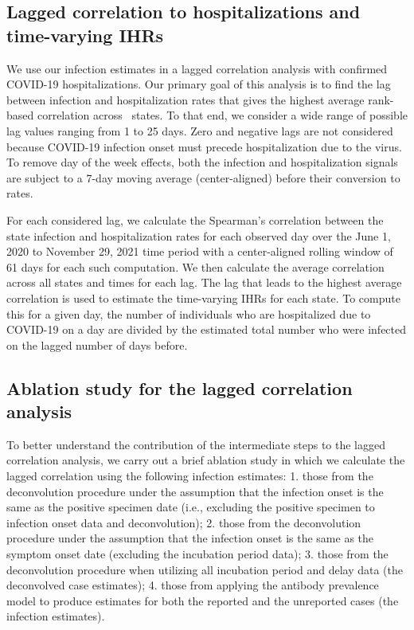 \documentclass{article}
\begin{document}
\subsection{Lagged correlation to hospitalizations and time-varying IHRs} 

We use our infection estimates in a lagged correlation analysis with
confirmed COVID-19 hospitalizations. Our primary goal of this analysis is to
find the lag between infection and hospitalization rates that gives the highest
average rank-based correlation across \US\ states. To that end, we consider a wide
range of possible lag values ranging from 1 to 25 days. Zero and negative
lags are not considered because COVID-19 infection onset must precede
hospitalization due to the virus. To remove day of the week effects, both the
infection and hospitalization signals are subject to a 7-day moving
average (center-aligned) before their conversion to rates.

For each considered lag, we calculate the Spearman's correlation between the 
state infection and hospitalization rates for each observed day 
over the June 1, 2020 to November 29, 2021
time period %
with a center-aligned rolling window of 61 days for each such computation.
We then calculate the average correlation across all states and times for each lag. 
The lag that leads to the highest average correlation is used to estimate 
the time-varying IHRs for each
state. To compute this for a given day, the number of individuals who are
hospitalized due to COVID-19 on a day are divided by the estimated total number
who were infected on the lagged number of days before.

\subsection{Ablation study for the lagged correlation analysis} 

To better understand the contribution of the intermediate steps to the lagged 
correlation analysis, we carry out a brief ablation study in which we calculate the 
lagged correlation using the following infection estimates: 1. those from the
deconvolution procedure under the assumption that the infection onset is the
same as the positive specimen date 
(i.e., excluding the positive specimen to infection onset data and deconvolution); 
2. those from the deconvolution procedure under the assumption that the infection onset is the
same as the symptom onset date (excluding the incubation period data); 
3. those from the deconvolution procedure when utilizing all incubation period and delay data 
(the deconvolved case estimates); 4. those from applying the antibody prevalence 
model to produce estimates for both the reported and the unreported 
cases (the infection estimates).
\end{document}

